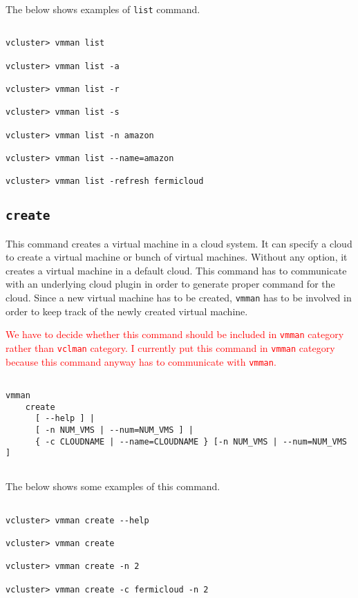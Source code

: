 \documentclass[11pt]{article}
\def \ttt{\texttt}
\def \vb{\verb}
\begin{document}
The below shows examples of \vb+list+ command.

\begin{Verbatim}[fontfamily=courier, fontsize = \small, obeytabs
=true, tabsize=4, frame=lines]

vcluster> vmman list

vcluster> vmman list -a

vcluster> vmman list -r

vcluster> vmman list -s

vcluster> vmman list -n amazon

vcluster> vmman list --name=amazon

vcluster> vmman list -refresh fermicloud

\end{Verbatim}


\subsection{\ttt{create}}

This command creates a virtual machine in a cloud system. It can specify a cloud to create a virtual machine or bunch of virtual machines. Without any option, it creates a virtual machine in a default cloud. This command has to communicate with an underlying cloud plugin in order to generate proper command for the cloud. Since a new virtual machine has to be created, \vb+vmman+ has to be involved in order to keep track of the newly created virtual machine.

\textcolor{red}{We have to decide whether this command should be included in \ttt{vmman} category rather than \ttt{vclman} category. I currently put this command in \ttt{vmman} category because this command anyway has to communicate with \ttt{vmman}.}

\begin{Verbatim}[fontfamily=courier, fontsize = \small, obeytabs
=true, tabsize=4, frame=lines]

vmman 
    create 
      [ --help ] |
      [ -n NUM_VMS | --num=NUM_VMS ] | 
      { -c CLOUDNAME | --name=CLOUDNAME } [-n NUM_VMS | --num=NUM_VMS ]  
      
\end{Verbatim}

The below shows some examples of this command.

\begin{Verbatim}[fontfamily=courier, fontsize = \small, obeytabs
=true, tabsize=4, frame=lines]

vcluster> vmman create --help

vcluster> vmman create  

vcluster> vmman create -n 2

vcluster> vmman create -c fermicloud -n 2

\end{Verbatim}
\end{document}
